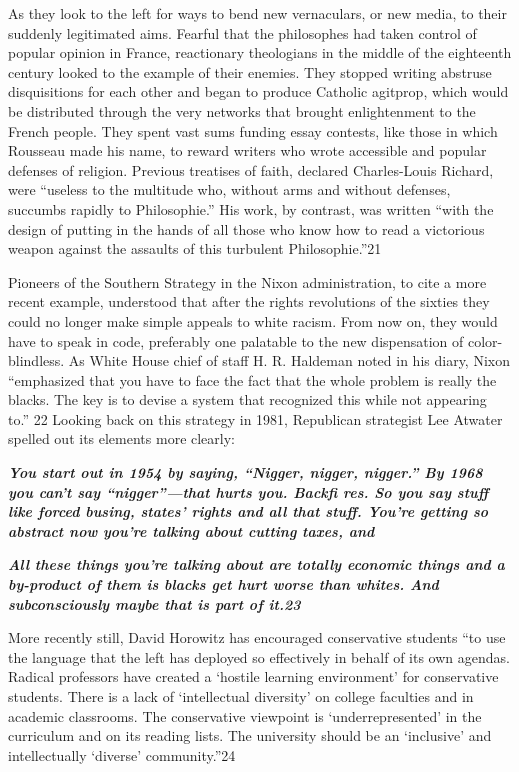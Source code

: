  \par 
As they look to the left for ways to bend new vernaculars, or new media, to their suddenly legitimated aims. Fearful that the philosophes had taken control of popular opinion in France, reactionary theologians in the middle of the eighteenth century looked to the example of their enemies. They stopped writing abstruse disquisitions for each other and began to produce Catholic agitprop, which would be distributed through the very networks that brought enlightenment to the French people. They spent vast sums funding essay contests, like those in which Rousseau made his name, to reward writers who wrote accessible and popular defenses of religion. Previous treatises of faith, declared Charles-Louis Richard, were “useless to the multitude who, without arms and without defenses, succumbs rapidly to Philosophie.” His work, by contrast, was written “with the design of putting in the hands of all those who know how to read a victorious weapon against the assaults of this turbulent Philosophie.”{\color{blue}21}
 \par 
Pioneers of the Southern Strategy in the Nixon administration, to cite a more recent example, understood that after the rights revolutions of the sixties they could no longer make simple appeals to white racism. From now on, they would have to speak in code, preferably one palatable to the new dispensation of color-blindless. As White House chief of staff H. R. Haldeman noted in his diary, Nixon “emphasized that you have to face the fact that the whole problem is really the blacks. The key is to devise a system that recognized this while not appearing to.” {\color{blue}22} Looking back on this strategy in 1981, Republican strategist Lee Atwater spelled out its elements more clearly:
 \par 
\textit\textbf{ {You start out in 1954 by saying, “Nigger, nigger, nigger.” By 1968 you can’t say “nigger”—that hurts you. Backfi res. So you say stuff like forced busing, states’ rights and all that stuff. You’re getting so abstract now you’re talking about cutting taxes, and} }
 \par 
\textit\textbf{ {All these things you’re talking about are totally economic things and a by-product of them is blacks get hurt worse than whites. And subconsciously maybe that is part of it.{\color{blue}23}} }
 \par 
More recently still, David Horowitz has encouraged conservative students “to use the language that the left has deployed so effectively in behalf of its own agendas. Radical professors have created a ‘hostile learning environment’ for conservative students. There is a lack of ‘intellectual diversity’ on college faculties and in academic classrooms. The conservative viewpoint is ‘underrepresented’ in the curriculum and on its reading lists. The university should be an ‘inclusive’ and intellectually ‘diverse’ community.”{\color{blue}24}
